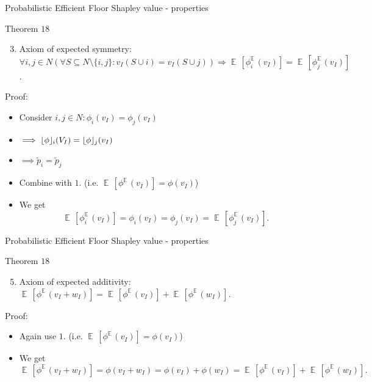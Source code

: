 \documentclass{beamer}
\newcommand{\floor}[1]{\left\lfloor #1 \right\rfloor}
\newcommand{\floorphi}{\ensuremath{\floor{\phi}\hspace{-0.5ex}}}
\DeclareMathOperator{\E}{\mathbb{E}\,}
\begin{document}
\begin{frame}{Probabilistic Efficient Floor Shapley value - properties}
    \begin{block}{Theorem $18$}
        \begin{enumerate}
            \setcounter{enumi}{2}
            \item Axiom of expected symmetry: $\forall i,j \in N (\forall S \subseteq N \setminus \{i,j\}: v_I(S \cup i) = v_I(S \cup j)) \Rightarrow \E[\phi_{i}^{\E}(v_I)] = \E[\phi_{j}^{\E}(v_I)]$.
        \end{enumerate}
    \end{block}

    Proof:

    \begin{itemize}
        \item Consider $i,j \in N: \phi_i(v_I) = \phi_j(v_I)$
        \item $\implies \floorphi_i(V_I) = \floorphi_j(v_I)$
        \item $\implies \tilde{p}_i = \tilde{p}_j$
        \item Combine with $1.$ (i.e. $\E[\phi^{\E}(v_I)] = \phi(v_I)$)
        \item We get
        \begin{displaymath}
            \E[\phi_{i}^{\E}(v_I)] = \phi_i(v_I) = \phi_j(v_I) = \E[\phi_{j}^{\E}(v_I)].
        \end{displaymath}
    \end{itemize}
\end{frame}



\begin{frame}{Probabilistic Efficient Floor Shapley value - properties}
    \begin{block}{Theorem $18$}
        \begin{enumerate}
            \setcounter{enumi}{4}
            \item Axiom of expected additivity: $\E[\phi^{\E}(v_I+w_I)] = \E[\phi^{\E}(v_I)] + \E[\phi^{\E}(w_I)]$.
        \end{enumerate}
    \end{block}

    Proof:

    \begin{itemize}

        \item Again use $1.$ (i.e. $\E[\phi^{\E}(v_I)] = \phi(v_I)$)
        \item We get
        \begin{displaymath}
            \E[\phi^{\E}(v_I+w_I)] = \phi(v_I+w_I) = \phi(v_I) + \phi(w_I) = \E[\phi^{\E}(v_I)] + \E[\phi^{\E}(w_I)].
        \end{displaymath}
    \end{itemize}

\end{frame}
\end{document}
